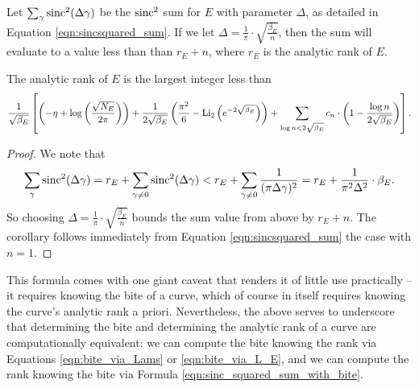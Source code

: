 \begin{theorem}[GRH]\label{thm:sinc_squared_sum_with_bite}
Let $\sum_{\gamma} \operatorname{sinc}^2(\Delta \gamma)$ be the $\operatorname{sinc}^2$ sum for $E$ with parameter $\Delta$, as detailed in Equation \ref{eqn:sincsquared_sum}. If we let $\Delta = \frac{1}{\pi}\cdot \sqrt{\frac{\beta_E}{n}}$, then the sum will evaluate to a value less than than $r_E+n$, where $r_E$ is the analytic rank of $E$.
\end{theorem}
\begin{corollary}[GRH]\label{cor:sinc_squared_sum_with_bite}
The analytic rank of $E$ is the largest integer less than
\begin{equation}\label{eqn:sinc_squared_sum_with_bite}
\frac{1}{\sqrt{\beta_E}}\left[\left(-\eta + \log\left(\frac{\sqrt{N_E}}{2\pi}\right)\right)+ \frac{1}{2 \sqrt{\beta_E}}\left(\frac{\pi^2}{6} - \operatorname{Li}_2\left(e^{-2\sqrt{\beta_E}}\right)\right) + \sum_{\log n<2\sqrt{\beta_E}} c_n \cdot \left(1-\frac{\log n}{2\sqrt{\beta_E}}\right)\right].
\end{equation}
\end{corollary}
\begin{proof}
We note that 
\begin{equation}
\sum_{\gamma} \operatorname{sinc}^2(\Delta \gamma) = r_E + \sum_{\gamma\ne 0} \operatorname{sinc}^2(\Delta \gamma) <  r_E + \sum_{\gamma\ne 0} \frac{1}{(\pi \Delta \gamma)^2} = r_E + \frac{1}{\pi^2 \Delta^2} \cdot \beta_E.
\end{equation}
So choosing $\Delta = \frac{1}{\pi}\cdot \sqrt{\frac{\beta_E}{n}}$ bounds the sum value from above by $r_E + n$. The corollary follows immediately from Equation \ref{eqn:sincsquared_sum} the case with $n=1$.
\end{proof}

This formula comes with one giant caveat that renders it of little use practically -- it requires knowing the bite of a curve, which of course in itself requires knowing the curve's analytic rank a priori. Nevertheless, the above serves to underscore that determining the bite and determining the analytic rank of a curve are computationally equivalent: we can compute the bite knowing the rank via Equations \ref{eqn:bite_via_Lams} or \ref{eqn:bite_via_L_E}, and we can compute the rank knowing the bite via Formula \ref{eqn:sinc_squared_sum_with_bite}. \\

